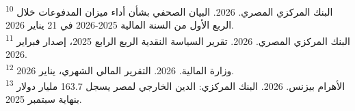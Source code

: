 \textsuperscript{10} البنك المركزي المصري. 2026. البيان الصحفي بشأن أداء ميزان المدفوعات خلال الربع الأول من السنة المالية 2025-2026 في 21 يناير 2026.\\
\textsuperscript{11} البنك المركزي المصري. 2026. تقرير السياسة النقدية الربع الرابع 2025، إصدار فبراير 2026.\\
\textsuperscript{12} وزارة المالية. 2026. التقرير المالي الشهري، يناير 2026.\\
\textsuperscript{13} الأهرام بيزنس. 2026. البنك المركزي: الدين الخارجي لمصر يسجل 163.7 مليار دولار بنهاية سبتمبر 2025.
